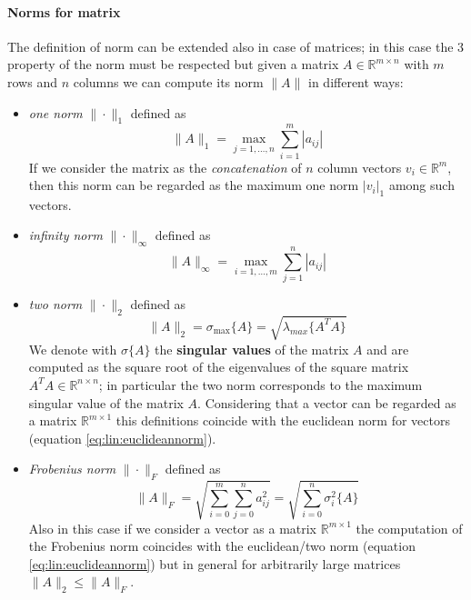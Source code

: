 	\paragraph{Norms for matrix} The definition of norm can be extended also in case of matrices; in this case the 3 property of the norm must be respected but given a matrix $A \in \mathds R^{m\times n}$ with $m$ rows and $n$ columns we can compute its norm $\| A\|$ in different ways:
	\begin{itemize}
		\item \textit{one norm} $\|\cdot\|_1$ defined as
		\begin{equation}
			\|A\|_1 = \max_{j=1,\dots, n} \sum_{i=1}^m |a_{ij}|
		\end{equation}
		If we consider the matrix as the \textit{concatenation} of $n$ column vectors $v_i \in \mathds R^m$, then this norm can be regarded as the maximum one norm $|v_i|_1$ among such vectors.
		
		\item \textit{infinity norm} $\|\cdot\|_\infty$ defined as
		\begin{equation}
			\|A\|_\infty = \max_{i = 1,\dots,m} \sum_{j=1}^n |a_{ij}|
		\end{equation}
		\item \textit{two norm} $\|\cdot\|_2$ defined as
		\begin{equation}
			\|A\|_2 = \sigma_{\max}\{ A \} = \sqrt{\lambda_{max} \{ A^T A \}  }
		\end{equation}
		We denote with $\sigma\{A\}$ the \textbf{singular values} of the matrix $A$ and are computed as the square root of the eigenvalues of the square matrix $A^T A \in \mathds R^{n\times n}$; in particular the two norm corresponds to the maximum singular value of the matrix $A$. Considering that a vector can be regarded as a matrix $\mathds R^{m\times 1}$ this definitions coincide with the euclidean norm for vectors (equation \ref{eq:lin:euclideannorm}).
		
		\item \textit{Frobenius norm} $\|\cdot\|_F$ defined as
		\begin{equation}
			\|A\|_F = \sqrt{ \sum_{i=0}^m \sum_{j=0}^n a_{ij}^2 } = \sqrt{ \sum_{i=0}^n \sigma_i^2\{A\} }
		\end{equation} 
		Also in this case if we consider a vector as a matrix $\mathds R^{m\times 1}$ the computation of the Frobenius norm coincides with the euclidean/two norm (equation \ref{eq:lin:euclideannorm}) but in general for arbitrarily large matrices $\|A\|_2 \leq \|A\|_F$.
	\end{itemize}
	
